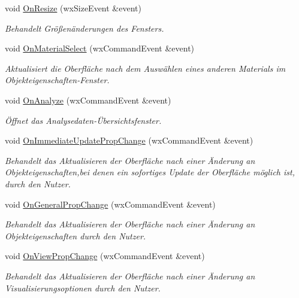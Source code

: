 \begin{DoxyCompactItemize}
void \hyperlink{classGUIMainWindow_a3a8bcd318ff00de01d8d417cf5226120}{On\-Resize} (wx\-Size\-Event \&event)
\begin{DoxyCompactList}\small\item\em Behandelt Größenänderungen des Fensters. \end{DoxyCompactList}\item 
void \hyperlink{classGUIMainWindow_a6618f0cc7d26ba7690c32a996f0b812e}{On\-Material\-Select} (wx\-Command\-Event \&event)
\begin{DoxyCompactList}\small\item\em Aktualisiert die Oberfläche nach dem Auswählen eines anderen Materials im Objekteigenschaften-\/\-Fenster. \end{DoxyCompactList}\item 
void \hyperlink{classGUIMainWindow_ac76ba4dd3d1175d66c1b13369ec26a69}{On\-Analyze} (wx\-Command\-Event \&event)
\begin{DoxyCompactList}\small\item\em Öffnet das Analysedaten-\/Übersichtsfenster. \end{DoxyCompactList}\item 
void \hyperlink{classGUIMainWindow_ae0b6c47ae833ea4b8323e9c344b1f70a}{On\-Immediate\-Update\-Prop\-Change} (wx\-Command\-Event \&event)
\begin{DoxyCompactList}\small\item\em Behandelt das Aktualisieren der Oberfläche nach einer Änderung an Objekteigenschaften,bei denen ein sofortiges Update der Oberfläche möglich ist, durch den Nutzer. \end{DoxyCompactList}\item 
void \hyperlink{classGUIMainWindow_a0eb68f1e4a740486706f98eeca783a68}{On\-General\-Prop\-Change} (wx\-Command\-Event \&event)
\begin{DoxyCompactList}\small\item\em Behandelt das Aktualisieren der Oberfläche nach einer Änderung an Objekteigenschaften durch den Nutzer. \end{DoxyCompactList}\item 
void \hyperlink{classGUIMainWindow_ada2a98f493fcdcbdc7bd6acb47d51218}{On\-View\-Prop\-Change} (wx\-Command\-Event \&event)
\begin{DoxyCompactList}\small\item\em Behandelt das Aktualisieren der Oberfläche nach einer Änderung an Visualisierungsoptionen durch den Nutzer. \end{DoxyCompactList}\item 

\end{DoxyCompactItemize}
